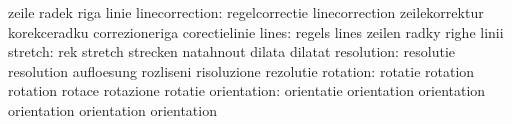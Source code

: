                            zeile                     radek
                           riga                      linie
           linecorrection: regelcorrectie            linecorrection
                           zeilekorrektur            korekceradku
                           correzioneriga            corectielinie
                    lines: regels                    lines
                           zeilen                    radky
                           righe                     linii
                  stretch: rek                       stretch
                           strecken                  natahnout
                           dilata                    dilatat %
               resolution: resolutie                 resolution
                           aufloesung                rozliseni
                           risoluzione               rezolutie
                 rotation: rotatie                   rotation
                           rotation                  rotace
                           rotazione                 rotatie
              orientation: orientatie                orientation
                           orientation               orientation
                           orientation               orientation


